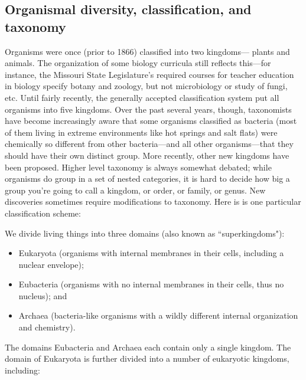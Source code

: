 \documentclass[11pt]{exam}
\begin{document}
\subsection*{Organismal diversity, classification, and taxonomy}

Organisms were once (prior to 1866) classified into two kingdoms—
plants and animals. The organization of some biology curricula still
reflects this—for instance, the Missouri State Legislature's
required courses for teacher education in biology specify botany and
zoology, but not microbiology or study of fungi, etc. Until fairly
recently, the generally accepted classification system put all organisms
into five kingdoms. Over the past several years, though, taxonomists
have become increasingly aware that some organisms classified as
bacteria (most of them living in extreme environments like hot springs
and salt flats) were chemically so different from other bacteria—and all
other organisms—that they should have their own distinct
group. More recently, other new kingdoms have been proposed. Higher
level taxonomy is always somewhat debated; while organisms do
group in a set of nested categories, it is hard to decide how big a group
you're going to call a kingdom, or order, or family, or genus. New discoveries
sometimes require modifications to
taxonomy. Here is is one particular classification scheme:

We divide living things into three domains (also known as
“superkingdoms"):

\begin{itemize}
\item
  Eukaryota (organisms with internal membranes in their cells, including
  a nuclear envelope);
\item
  Eubacteria (organisms with no internal membranes in their cells, thus
  no nucleus); and
\item
  Archaea (bacteria-like organisms with a wildly different internal
  organization and chemistry).
\end{itemize}

\noindent The domains Eubacteria and Archaea each contain only a single kingdom. 
The domain of Eukaryota is further divided into a number of eukaryotic
kingdoms, including:
\end{document}
